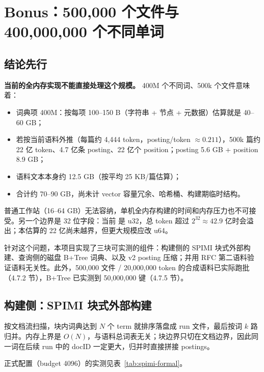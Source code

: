 \section{Bonus：500,000 个文件与 400,000,000 个不同单词}

\subsection{结论先行}

\textbf{当前的全内存实现不能直接处理这个规模。} 400M 个不同词、500k 个文件意味着：

\begin{itemize}
  \item 词典项 400M：按每项 100--150 B（字符串 + 节点 + 元数据）估算就是 40--60 GB；
  \item 若按当前语料外推（每篇约 4,444 token，posting/token $\approx 0.211$），500k 篇约 22 亿 token、4.7 亿条 posting、22 亿个 position；posting 5.6 GB + position 8.9 GB；
  \item 语料文本本身约 12.5 GB（按平均 25 KB/篇估算）；
  \item 合计约 70--90 GB，尚未计 vector 容量冗余、哈希桶、构建期临时结构。
\end{itemize}

普通工作站（16--64 GB）无法容纳，单机全内存构建的时间和内存压力也不可接受。另一个边界是 32 位字段：当前  是 u32，总 token 超过 $2^{32} \approx 42.9$ 亿时会溢出；本估算的 22 亿尚未越界，但更大规模应改 u64。

针对这个问题，本项目实现了三块可实测的组件：构建侧的 SPIMI 块式外部构建、查询侧的磁盘 B+Tree 词典、以及 v2 posting 压缩；并用 RFC 第二语料验证语料无关性。此外，500,000 文件 / 20,000,000 token 的合成语料已实际跑批（4.7.2 节），B+Tree 已实测到 50,000,000 键（4.7.5 节）。

\subsection{构建侧：SPIMI 块式外部构建}

 按文档流扫描，块内词典达到 $N$ 个 term 就排序落盘成 run 文件，最后按词 $k$ 路归并。内存上界是 $O(N)$，与语料总词表无关；块边界只切在文档边界，因此同一词在后续 run 中的 docID 一定更大，归并时直接拼接 postings。

正式配置（budget 4096）的实测见表~\ref{tab:spimi-formal}。

